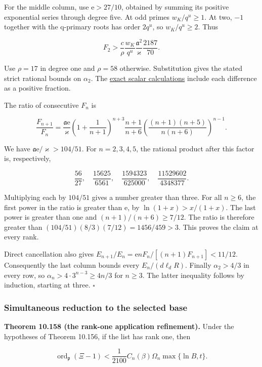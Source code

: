 \documentclass[
  11pt,
  a4paper,
]{article}
\begin{document}
For the middle column, use \(\mathrm e>27/10\), obtained by summing its
positive exponential series through degree five. At odd primes
\(w_K/q^u\ge1\). At two, \(-1\) together with the q-primary roots has
order \(2q^u\), so \(w_K/q^u\ge2\). Thus

\[
F_2>\frac c\rho\frac{w_K}{q^u}
\frac{\mathfrak a^2}{\varkappa}\frac{2187}{70}.
\tag{10.494}
\]

Use \(\rho=17\) in degree one and \(\rho=58\) otherwise. Substitution
gives the stated strict rational bounds on \(\alpha_2\). The
\href{../figure_sources/yu_rank_one_refinement_enclosures.py}{exact
scalar calculations} include each difference as a positive fraction.

The ratio of consecutive \(F_n\) is

\[
\frac{F_{n+1}}{F_n}=
\frac{\mathfrak a\mathrm e}{\varkappa}
\left(1+\frac1{n+1}\right)^{n+3}
\frac{n+1}{n+6}
\left(\frac{(n+1)(n+5)}{n(n+6)}\right)^{n-1}.
\tag{10.495}
\]

We have \(\mathfrak a\mathrm e/\varkappa>104/51\). For \(n=2,3,4,5\),
the rational product after this factor is, respectively,

\[
\frac{56}{27},\quad\frac{15625}{6561},\quad
\frac{1594323}{625000},\quad\frac{11529602}{4348377}.
\tag{10.496}
\]

Multiplying each by \(104/51\) gives a number greater than three. For
all \(n\ge6\), the first power in the ratio is greater than
\(\mathrm e\), by \(\ln(1+x)>x/(1+x)\). The last power is greater than
one and \((n+1)/(n+6)\ge7/12\). The ratio is therefore greater than
\((104/51)(8/3)(7/12)=1456/459>3\). This proves the claim at every rank.

Direct cancellation also gives
\(E_{n+1}/E_n=\mathrm e nF_n/[(n+1)F_{n+1}]<11/12\). Consequently the
last column bounds every \(E_n/(d\ell_dR)\). Finally \(\alpha_2>4/3\) in
every row, so \(\alpha_n>4\cdot3^{n-3}\ge4n/3\) for \(n\ge3\). The
latter inequality follows by induction, starting at three. \(\square\)

\subsubsection{Simultaneous reduction to the selected
base}\label{simultaneous-reduction-to-the-selected-base}

\textbf{Theorem 10.158 (the rank-one application refinement).} Under the
hypotheses of Theorem 10.156, if the list has rank one, then

\[
\operatorname{ord}_{\mathfrak p}(\Xi-1)
<\frac1{2100}C_n(\beta)\Omega_n\max\{\ln B,t\}.
\tag{10.497}
\]
\end{document}
